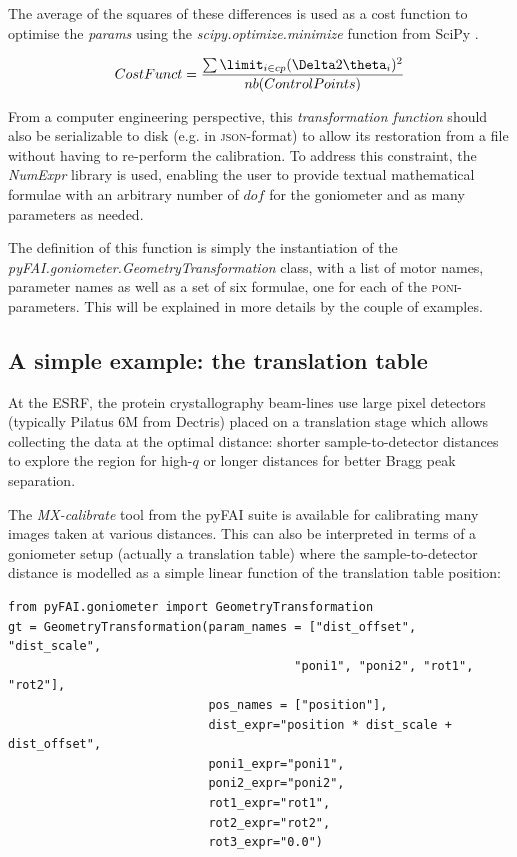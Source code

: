 \documentclass[preprint]{iucr}              %
\begin{document}
The average of the squares of these differences is used as a cost function
to optimise the \textit{params} using the \textit{scipy.optimize.minimize}
function from SciPy \cite{scipy}.

$$
CostFunct = \frac{ \sum\limit_{i \in cp} {(\Delta 2\theta_i)^2}}
{nb(ControlPoints)} $$

From a computer engineering perspective, this \textit{transformation function}
should also be serializable to disk (e.g. in \textsc{json}-format) to allow
its restoration from a file without having to re-perform the calibration. 
To address this constraint, the \textit{NumExpr} library \cite{numexpr} is
used, enabling the user to provide textual mathematical formulae with
an arbitrary number of $dof$ for the goniometer and as many parameters
as needed.

The definition of this function is simply the instantiation of the
\textit{pyFAI.goniometer.GeometryTransformation} class, with a list of
motor names, parameter names as well as a set of six formulae, one for each of
the \textsc{poni}-parameters.
This will be explained in more details by the couple of examples.

\subsection{A simple example: the translation table}

At the  ESRF, the protein crystallography beam-lines use large pixel detectors
(typically Pilatus 6M from Dectris) placed on a translation stage which allows
collecting the data at the optimal distance: shorter sample-to-detector
distances to explore the region for high-$q$ 
or longer distances for better Bragg peak separation. 

The \textit{MX-calibrate} tool from the pyFAI suite is available for
calibrating many images taken at various distances.
This can also be interpreted in terms of a goniometer setup (actually a translation table) where the sample-to-detector distance is modelled as a
simple linear function of the translation table position:

\begin{verbatim}
from pyFAI.goniometer import GeometryTransformation
gt = GeometryTransformation(param_names = ["dist_offset", "dist_scale", 
                                        "poni1", "poni2", "rot1", "rot2"],
                            pos_names = ["position"],
                            dist_expr="position * dist_scale + dist_offset", 
                            poni1_expr="poni1",
                            poni2_expr="poni2", 
                            rot1_expr="rot1", 
                            rot2_expr="rot2", 
                            rot3_expr="0.0")
\end{verbatim}
 
\end{document}
